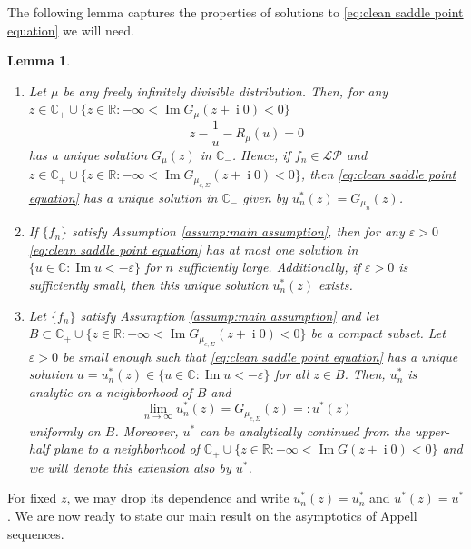 \documentclass[reqno]{amsart}
\newcommand{\1}{\mathbf{1}}
\DeclareMathOperator{\ii}{i}
\newcommand{\C}{\mathbb{C}}
\renewcommand\Im{\operatorname{Im}}
\newcommand{\eps}{\varepsilon}
\newcommand{\R}{\mathbb{R}}
\def\R{\mathbb{R}}
\newcommand{\LP}{\mathcal{LP}}
\theoremstyle{plain}
\newtheorem{lemma}[theorem]{Lemma}
\theoremstyle{definition}
\theoremstyle{remark}
\numberwithin{equation}{section}
\begin{document}
The following lemma captures the properties of solutions to \eqref{eq:clean saddle point equation} we will need.

\begin{lemma}\label{lem:clean lem_unique_saddlepoint}
\begin{enumerate}
	\item Let $\mu$ be any freely infinitely divisible distribution. Then, for any $z\in\C_{+}\cup\{z\in\R: -\infty<\Im G_{\mu}(z+\ii0)<0\}$
	 \begin{equation}\label{eq:general R transform version saddle point.}
	z-\frac{1}{u}-R_{\mu}(u)=0
\end{equation} has a unique solution $G_{\mu}(z)$ in $\C_-$. Hence, if $f_n\in\LP$ and $z\in\C_{+}\cup\{z\in\R:-\infty< \Im G_{\mu_{c,\Sigma}}(z+\ii0)<0 \}$, then \eqref{eq:clean saddle point equation} has a unique solution in $\C_{-}$ given by $u_n^*(z)=G_{\mu_n}(z)$.

\item If $\{f_{n}\}$ satisfy Assumption \ref{assump:main assumption}, then for any $\eps>0$ \eqref{eq:clean saddle point equation} has at most one solution in $\{u\in\C:\Im u<-\eps\}$ for $n$ sufficiently large. Additionally, if $\eps>0$ is sufficiently small, then this unique solution $u_n^*(z)$ exists. 

\item Let $\{f_n\}$ satisfy Assumption \ref{assump:main assumption} and let $B\subset\C_{+}\cup\{z\in\R: -\infty<\Im G_{\mu_{c,\Sigma}}(z+\ii0)<0 \}$ be a compact subset. Let $\eps>0$ be small enough such that \eqref{eq:clean saddle point equation} has a unique solution $u=u_n^*(z)\in\{u\in\C:\Im u<-\eps\}$ for all $z\in B$. Then, $u_n^*$ is analytic on a neighborhood of $B$ and \begin{equation}\label{eq:convergence of ID Cauchy}
	\lim\limits_{n\rightarrow\infty}u_n^*(z)=G_{\mu_{c,\Sigma}}(z)=:u^*(z)
\end{equation} uniformly on $B$. Moreover, $u^*$ can be analytically continued from the upper-half plane to a neighborhood of $\C_+\cup\{z\in\R: -\infty< \Im G(z+\ii0)<0\}$ and we will denote this extension also by $u^*$.

\end{enumerate}
\end{lemma}

For fixed $z$, we may drop its dependence and write $u_n^*(z)=u_n^*$ and $u^*(z)=u^*$.
We are now ready to state our main result on the asymptotics of Appell sequences. 
\end{document}
